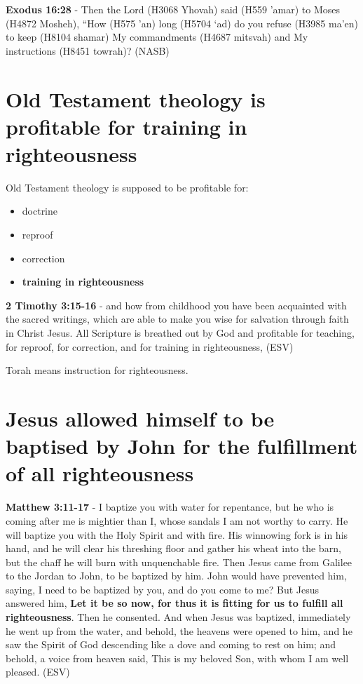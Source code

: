 \documentclass[11pt]{article}
\begin{document}
\textbf{Exodus 16:28} - Then the Lord (H3068 Yhovah) said (H559 'amar) to Moses (H4872 Mosheh), “How (H575 'an) long (H5704 `ad) do you refuse (H3985 ma'en) to keep (H8104 shamar) My commandments (H4687 mitsvah) and My instructions (H8451 towrah)? (NASB)

\section{Old Testament theology is profitable for training in righteousness}
\label{sec:orgd5c19c6}
Old Testament theology is supposed to be profitable for:
\begin{itemize}
\item doctrine
\item reproof
\item correction
\item \textbf{training in righteousness}
\end{itemize}

\textbf{2 Timothy 3:15-16} -  and how from childhood you have been acquainted with the sacred writings, which are able to make you wise for salvation through faith in Christ Jesus.  All Scripture is breathed out by God and profitable for teaching, for reproof, for correction, and for training in righteousness,  (ESV)

Torah means instruction for righteousness.

\section{Jesus allowed himself to be baptised by John for the fulfillment of all righteousness}
\label{sec:orgd0da6c8}
\textbf{Matthew 3:11-17} - I baptize you with water for repentance, but he who is coming after me is mightier than I, whose sandals I am not worthy to carry. He will baptize you with the Holy Spirit and with fire.  His winnowing fork is in his hand, and he will clear his threshing floor and gather his wheat into the barn, but the chaff he will burn with unquenchable fire.  Then Jesus came from Galilee to the Jordan to John, to be baptized by him.  John would have prevented him, saying, I need to be baptized by you, and do you come to me?  But Jesus answered him, \textbf{Let it be so now, for thus it is fitting for us to fulfill all righteousness}. Then he consented.  And when Jesus was baptized, immediately he went up from the water, and behold, the heavens were opened to him, and he saw the Spirit of God descending like a dove and coming to rest on him; and behold, a voice from heaven said, This is my beloved Son, with whom I am well pleased. (ESV)
\end{document}

